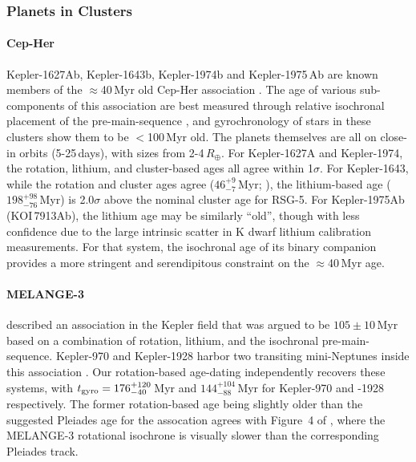 \documentclass[11pt,twocolumn,tighten]{aastex63}
\begin{document}
\subsubsection{Planets in Clusters}
\label{subsec:clusterplanets}

\paragraph{Cep-Her}
Kepler-1627Ab, Kepler-1643b, Kepler-1974b and Kepler-1975\,Ab are
known members of the $\approx$40\,Myr old Cep-Her association
\citep{Bouma_2022a,Bouma_2022b}.  The age of various sub-components of
this association are best measured through relative isochronal
placement of the pre-main-sequence \citep[see][]{Bouma_2022b}, and
gyrochronology of stars in these clusters show them to be $<$100\,Myr
old.  The planets themselves are all on close-in orbits (5-25\,days),
with sizes from 2-4\,$R_\oplus$.  For Kepler-1627A and Kepler-1974,
the rotation, lithium, and cluster-based ages all agree within
1$\sigma$.  For Kepler-1643, while the rotation and cluster ages agree
($46^{+9}_{-7}$\,Myr; \citealt{Bouma_2022b}), the lithium-based age
($198^{+98}_{-76}$\,Myr) is 2.0$\sigma$ above the nominal cluster age
for RSG-5.  For Kepler-1975Ab (KOI\,7913Ab), the lithium age may be
similarly ``old'', though with less confidence due to the large
intrinsic scatter in K dwarf lithium calibration measurements.  For
that system, the isochronal age of its binary companion provides a
more stringent and serendipitous constraint on the $\approx$40\,Myr
age.

\paragraph{MELANGE-3}
\citet{2022AJ....164...88B} described an association in the Kepler
field that was argued to be $105\pm10$\,Myr based on a combination of
rotation, lithium, and the isochronal pre-main-sequence.  Kepler-970
and Kepler-1928 harbor two transiting mini-Neptunes inside this
association \citep{2022AJ....164...88B}.  Our rotation-based
age-dating independently recovers these systems, with $t_{\rm
gyro}=176_{-40}^{+120}$\,Myr and $144_{-88}^{+104}$\,Myr for
Kepler-970 and -1928 respectively.  The former rotation-based age
being slightly older than the suggested Pleiades age for the
assocation agrees with Figure~4 of \citet{2022AJ....164...88B}, where
the MELANGE-3 rotational isochrone is visually slower than
the corresponding Pleiades track.
\end{document}
